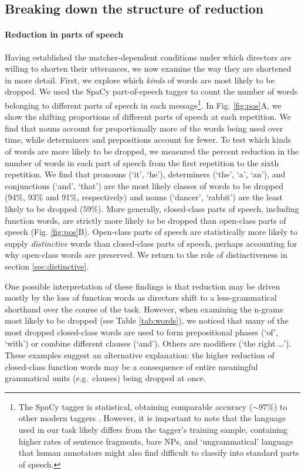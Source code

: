 \documentclass[alpha-refs]{wiley-article}
\begin{document}
\subsection{Breaking down the structure of reduction}\label{reduction}

\paragraph{Reduction in parts of speech}

Having established the matcher-dependent conditions under which directors are willing to shorten their utterances, we now examine the way they are shortened in more detail.
First, we explore which \emph{kinds} of words are most likely to be dropped.
We used the SpaCy part-of-speech tagger \citep{spacy2} to count the number of words belonging to different parts of speech in each message\footnote{The SpaCy tagger is statistical, obtaining comparable accuracy ($\sim 97\%$) to other modern taggers \citep{manning2011part}. However, it is important to note that the language used in our task likely differs from the tagger's training sample, containing higher rates of sentence fragments, bare NPs, and `ungrammatical' language that human annotators might also find difficult to classify into standard parts of speech.}. %
In Fig. \ref{fig:pos}A, we show the shifting proportions of different parts of speech at each repetition.
We find that nouns account for proportionally more of the words being used over time, while determiners and prepositions account for fewer.
To test which kinds of words are more likely to be dropped, we measured the percent reduction in the number of words in each part of speech from the first repetition to the sixth repetition.
We find that pronouns (`it', `he'), determiners (`the', `a', `an'), and conjunctions (`and', `that') are the most likely classes of words to be dropped (94\%, 93\% and 91\%, respectively) and nouns (`dancer', `rabbit') are the least likely to be dropped (59\%).
More generally, closed-class parts of speech, including function words, are strictly more likely to be dropped than open-class parts of speech (Fig. \ref{fig:pos}B).
Open-class parts of speech are statistically more likely to supply \emph{distinctive} words than closed-class parts of speech, perhaps accounting for why open-class words are preserved.
We return to the role of distinctiveness in section \ref{sec:distinctive}.

One possible interpretation of these findings is that reduction may be driven mostly by the loss of function words as directors shift to a less-grammatical shorthand over the course of the task.
However, when examining the n-grams most likely to be dropped (see Table \ref{tab:words}), we noticed that many of the most dropped closed-class words are used to  form prepositional phases (`of', `with') or combine different clauses (`and').
Others are modifiers (`the right \dots').
These examples suggest an alternative explanation: the higher reduction of closed-class function words may be a consequence of entire meaningful grammatical units (e.g.~clauses) being dropped at once.
\end{document}

